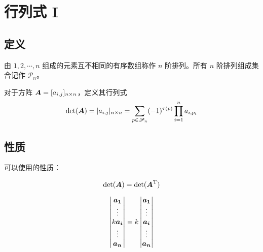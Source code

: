 \section{行列式 I}

\subsection{定义}

\begin{definition}[排列的定义]
	由 $1,2,\cdots,n$ 组成的元素互不相同的有序数组称作 $n$ 阶排列。所有 $n$ 阶排列组成集合记作 $\mathscr{P}_n$。
\end{definition}

\begin{definition}[行列式的定义]
	对于方阵 $\boldsymbol{A} = [a_{i,j}]_{n \times n}$，定义其行列式
	$$
	\det(\boldsymbol{A}) = |a_{i,j}|_{n \times n} = \sum_{p \in \mathscr{P}_n} (-1)^{\tau(p)} \prod_{i = 1}^n a_{i,p_i}
	$$
\end{definition}

\subsection{性质}

可以使用的性质：

\begin{property}
	$$
	\det(\boldsymbol{A}) = \det(\boldsymbol{A}^{\text{T}})
	$$
\end{property}

\begin{property}
	$$
	\begin{vmatrix}
		\boldsymbol{a_1} \\
		\vdots \\
		k \boldsymbol{a_i} \\
		\vdots \\
		\boldsymbol{a_n}
	\end{vmatrix} =
	k \begin{vmatrix}
		\boldsymbol{a_1} \\
		\vdots \\
		\boldsymbol{a_i} \\
		\vdots \\
		\boldsymbol{a_n}
	\end{vmatrix}
	$$
\end{property}

